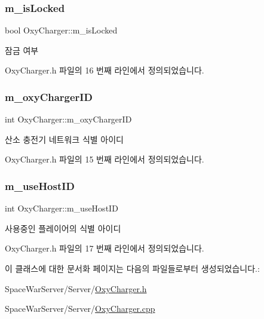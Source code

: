 \subsubsection{\texorpdfstring{m\+\_\+is\+Locked}{m\_isLocked}}
{\footnotesize\ttfamily bool Oxy\+Charger\+::m\+\_\+is\+Locked\hspace{0.3cm}{\ttfamily [private]}}



잠금 여부 



Oxy\+Charger.\+h 파일의 16 번째 라인에서 정의되었습니다.

\mbox{\label{class_oxy_charger_a7229fb2e4423cad1f648bd710ee8d092}} 
\subsubsection{\texorpdfstring{m\+\_\+oxy\+Charger\+ID}{m\_oxyChargerID}}
{\footnotesize\ttfamily int Oxy\+Charger\+::m\+\_\+oxy\+Charger\+ID\hspace{0.3cm}{\ttfamily [private]}}



산소 충전기 네트워크 식별 아이디 



Oxy\+Charger.\+h 파일의 15 번째 라인에서 정의되었습니다.

\mbox{\label{class_oxy_charger_af10a0504b33a8e3b6ded341cf067b9ad}} 
\subsubsection{\texorpdfstring{m\+\_\+use\+Host\+ID}{m\_useHostID}}
{\footnotesize\ttfamily int Oxy\+Charger\+::m\+\_\+use\+Host\+ID\hspace{0.3cm}{\ttfamily [private]}}



사용중인 플레이어의 식별 아이디 



Oxy\+Charger.\+h 파일의 17 번째 라인에서 정의되었습니다.



이 클래스에 대한 문서화 페이지는 다음의 파일들로부터 생성되었습니다.\+:\begin{DoxyCompactItemize}
\item 
Space\+War\+Server/\+Server/\hyperlink{_oxy_charger_8h}{Oxy\+Charger.\+h}\item 
Space\+War\+Server/\+Server/\hyperlink{_oxy_charger_8cpp}{Oxy\+Charger.\+cpp}\end{DoxyCompactItemize}
